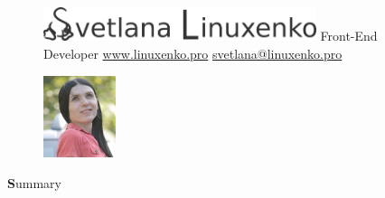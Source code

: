 \documentclass[a4paper,12pt]{article}
\begin{document}
\begin{figure}
  \begin{flushright}
    \begin{minipage}{0.50\textwidth}
      \flushright
      {\includegraphics[height=28pt]{s}}\hfill\break
      \large{Front-End Developer}\hspace{22pt}\break
      \normalsize{
      \href{https://www.linuxenko.pro}{www.linuxenko.pro}\hspace{22pt}\break
      \href{mailto:svetlana@linuxenko.pro}{svetlana@linuxenko.pro}\hspace{22pt}\break
    }
    \end{minipage}
    \begin{minipage}{0.10\textwidth}
      {\includegraphics[height=68pt]{pic}}
    \end{minipage}
    \break
  \end{flushright}
\end{figure}


%

{\large \textbf{S}ummary}\\
\end{document}
